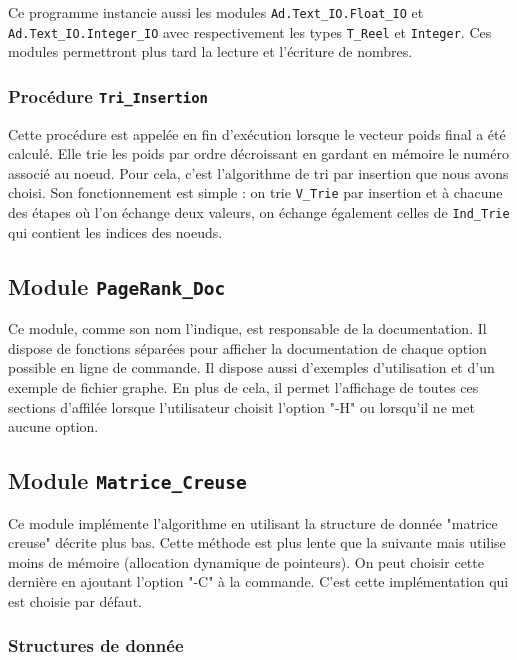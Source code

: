 \documentclass{article}
\begin{document}
Ce programme instancie aussi les modules \texttt{Ad.Text\_IO.Float\_IO} et \texttt{Ad.Text\_IO.Integer\_IO} avec respectivement les types \texttt{T\_Reel} et \texttt{Integer}. Ces modules permettront plus tard la lecture et l'écriture de nombres.

\subsubsection{Procédure \texttt{Tri\_Insertion}}

Cette procédure est appelée en fin d'exécution lorsque le vecteur poids final a été calculé. Elle trie les poids par ordre décroissant en gardant en mémoire le numéro associé au noeud. Pour cela, c'est l'algorithme de tri par insertion que nous avons choisi. Son fonctionnement est simple : on trie \texttt{V\_Trie} par insertion et à chacune des étapes où l'on échange deux valeurs, on échange également celles de \texttt{Ind\_Trie} qui contient les indices des noeuds.

\subsection{Module \texttt{PageRank\_Doc}}

Ce module, comme son nom l'indique, est responsable de la documentation. Il dispose de fonctions séparées pour afficher la documentation de chaque option possible en ligne de commande. Il dispose aussi d'exemples d'utilisation et d'un exemple de fichier graphe. En plus de cela, il permet l'affichage de toutes ces sections d'affilée lorsque l'utilisateur choisit l'option "-H" ou lorsqu'il ne met aucune option.

\subsection{Module \texttt{Matrice\_Creuse}}

Ce module implémente l'algorithme  en utilisant la structure de donnée "matrice creuse" décrite plus bas. Cette méthode est plus lente que la suivante mais utilise moins de mémoire (allocation dynamique de pointeurs). On peut choisir cette dernière en ajoutant l'option "-C" à la commande. C'est cette implémentation qui est choisie par défaut.

\subsubsection{Structures de donnée}
\end{document}
